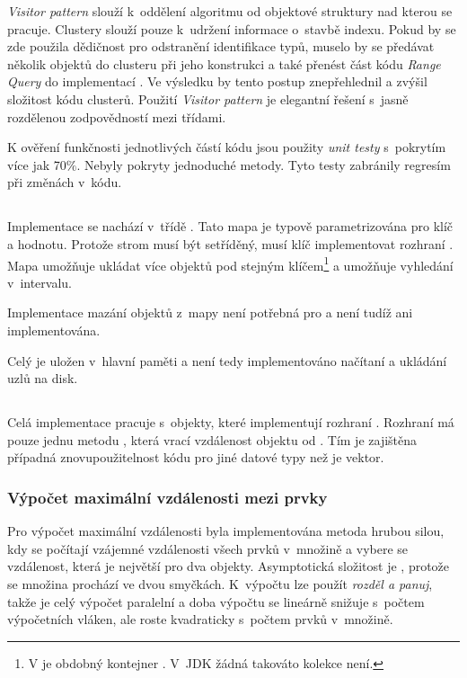 \emph{Visitor pattern} slouží k~oddělení algoritmu od objektové struktury nad kterou se pracuje.
Clustery  slouží pouze k~udržení informace o~stavbě indexu.
Pokud by se zde použila dědičnost pro odstranění identifikace typů, muselo by se předávat několik objektů do clusteru při jeho konstrukci a také přenést část kódu \emph{Range Query} do implementací .
Ve výsledku by tento postup znepřehlednil a zvýšil složitost kódu clusterů.
Použití \emph{Visitor pattern} je elegantní řešení s~jasně rozdělenou zodpovědností mezi třídami.

K ověření funkčnosti jednotlivých částí kódu jsou použity \emph{unit testy} s~pokrytím více jak 70$\%$.
Nebyly pokryty jednoduché metody.
Tyto testy zabránily regresím při změnách v~kódu.

\subsection{\BPTree}
Implementace \BPTree{} se nachází v~třídě \linebreak {}. Tato mapa je typově parametrizována pro klíč a hodnotu. Protože strom musí být setříděný, musí klíč implementovat rozhraní . Mapa umožňuje ukládat více objektů pod stejným klíčem\footnote{V \CC{} je obdobný kontejner \cite{ISO:2012:CPP}. V~JDK žádná takováto kolekce není.} a umožňuje vyhledání v~intervalu.

Implementace mazání objektů z~mapy není potřebná pro \MIndex{} a není tudíž ani implementována.

Celý \BPTree{} je uložen v~hlavní paměti a není tedy implementováno načítaní a ukládání uzlů na disk.

\subsection{\MIndex{}}
Celá implementace \MIndex{} pracuje s~objekty, které implementují rozhraní .
Rozhraní  má pouze jednu metodu , která vrací vzdálenost objektu od .
Tím je zajištěna případná znovupoužitelnost kódu pro jiné datové typy než je vektor.

\subsubsection{Výpočet maximální vzdálenosti mezi prvky}
Pro výpočet maximální vzdálenosti byla implementována metoda hrubou silou, kdy se počítají vzájemné vzdálenosti všech prvků v~množině a vybere se vzdálenost, která je největší pro dva objekty.
Asymptotická složitost je , protože se množina prochází ve dvou smyčkách.
K~výpočtu lze použít \emph{rozděl a panuj}, takže je celý výpočet paralelní a doba výpočtu se lineárně snižuje s~počtem výpočetních vláken, ale roste kvadraticky s~počtem prvků v~množině.

